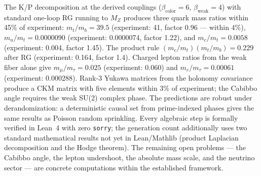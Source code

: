 \documentclass[12pt,a4paper]{article}
\begin{document}
The K/P decomposition at the derived couplings ($\beta_{\mathrm{color}} = 6$, $\beta_{\mathrm{weak}} = 4$) with standard one-loop RG running to $M_Z$ produces three quark mass ratios within 45\% of experiment: $m_t/m_b = 39.5$ (experiment: 41, factor 0.96 --- within 4\%), $m_u/m_t = 0.0000090$ (experiment: 0.0000074, factor 1.22), and $m_c/m_t = 0.0058$ (experiment: 0.004, factor 1.45).  The product rule $(m_c/m_t)(m_t/m_b) = 0.229$ after RG (experiment: 0.164, factor 1.4). Charged lepton ratios from the weak fiber alone give $m_\mu/m_\tau = 0.025$ (experiment: 0.060) and $m_e/m_\tau = 0.00061$ (experiment: 0.000288). Rank-3 Yukawa matrices from the holonomy covariance produce a CKM matrix with five elements within 3\% of experiment; the Cabibbo angle requires the weak SU(2) complex phase. The predictions are robust under derandomization: a deterministic causal set from prime-indexed phases gives the same results as Poisson random sprinkling.  Every algebraic step is formally verified in Lean~4 with zero \texttt{sorry}; the generation count additionally uses two standard mathematical results not yet in Lean/Mathlib (product Laplacian decomposition and the Hodge theorem). The remaining open problems --- the Cabibbo angle, the lepton undershoot, the absolute mass scale, and the neutrino sector --- are concrete computations within the established framework.

\medskip
\end{document}
